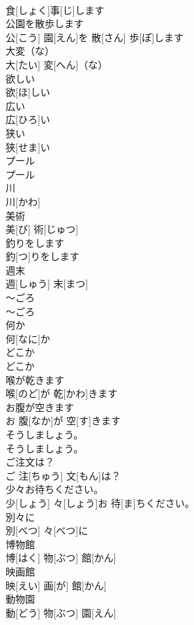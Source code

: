 \documentclass[8pt]{extreport}
\begin{document}
\begin{CJK}{UTF8}{min}
\\	食[しょく]事[じ]します		
\\	公園を散歩します	
\\	公[こう] 園[えん]を 散[さん] 歩[ぽ]します		
\\	大変（な）	
\\	大[たい] 変[へん]（な）		
\\	欲しい	
\\	欲[ほ]しい		
\\	広い	
\\	広[ひろ]い		
\\	狭い	
\\	狭[せま]い		
\\	プール	
\\	プール		
\\	川	
\\	川[かわ]		
\\	美術	
\\	美[び] 術[じゅつ]		
\\	釣りをします	
\\	釣[つ]りをします		
\\	週末	
\\	週[しゅう] 末[まつ]		
\\	～ごろ	
\\	～ごろ		
\\	何か	
\\	何[なに]か		
\\	どこか	
\\	どこか		
\\	喉が乾きます	
\\	喉[のど]が 乾[かわ]きます		
\\	お腹が空きます	
\\	お 腹[なか]が 空[す]きます		
\\	そうしましょう。	
\\	そうしましょう。		
\\	ご注文は？	
\\	ご 注[ちゅう] 文[もん]は？		
\\	少々お待ちください。	
\\	少[しょう] 々[しょう]お 待[ま]ちください。		
\\	別々に	
\\	別[べつ] 々[べつ]に		
\\	博物館	
\\	博[はく] 物[ぶつ] 館[かん]		
\\	映画館	
\\	映[えい] 画[が] 館[かん]		
\\	動物園	
\\	動[どう] 物[ぶつ] 園[えん]		

\end{CJK}
\end{document}
